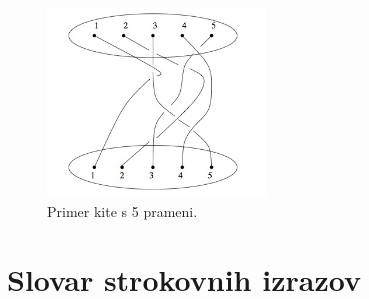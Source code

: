 \documentclass[mat1]{fmfdelo}
\begin{document}
\begin{figure}[h!]
\includegraphics[height = 5cm]{Primer_kite_1}
\caption{Primer kite s 5 prameni.}
\end{figure}






\section*{Slovar strokovnih izrazov}

\geslo{}{}


\begin{thebibliography}{99}


\end{thebibliography}
\end{document}
